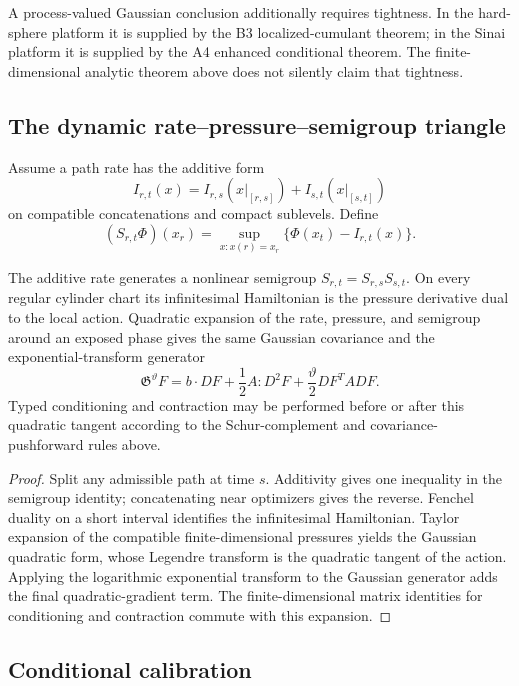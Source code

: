 A process-valued Gaussian conclusion additionally requires tightness.  In the
hard-sphere platform it is supplied by the B3 localized-cumulant theorem; in
the Sinai platform it is supplied by the A4 enhanced conditional theorem.
The finite-dimensional analytic theorem above does not silently claim that
tightness.

\subsection{The dynamic rate--pressure--semigroup triangle}

Assume a path rate has the additive form
\[
I_{r,t}(x)=I_{r,s}(x|_{[r,s]})+I_{s,t}(x|_{[s,t]})
\]
on compatible concatenations and compact sublevels.  Define
\[
(S_{r,t}\Phi)(x_r)=
\sup_{x:x(r)=x_r}\{\Phi(x_t)-I_{r,t}(x)\}.
\]

\begin{theorem}
\label{thm:r6-d1-dynamic}
The additive rate generates a nonlinear semigroup
\(S_{r,t}=S_{r,s}S_{s,t}\).  On every regular cylinder chart its infinitesimal
Hamiltonian is the pressure derivative dual to the local action.  Quadratic
expansion of the rate, pressure, and semigroup around an exposed phase gives
the same Gaussian covariance and the exponential-transform generator
\[
\mathfrak G^\vartheta F=
 b\cdot DF+\frac12A:D^2F+
\frac\vartheta2DF^TADF.
\]
Typed conditioning and contraction may be performed before or after this
quadratic tangent according to the Schur-complement and covariance-pushforward
rules above.
\end{theorem}

\begin{proof}
Split any admissible path at time \(s\).  Additivity gives one inequality in
the semigroup identity; concatenating near optimizers gives the reverse.
Fenchel duality on a short interval identifies the infinitesimal Hamiltonian.
Taylor expansion of the compatible finite-dimensional pressures yields the
Gaussian quadratic form, whose Legendre transform is the quadratic tangent of
the action.  Applying the logarithmic exponential transform to the Gaussian
generator adds the final quadratic-gradient term.  The finite-dimensional
matrix identities for conditioning and contraction commute with this
expansion.
\end{proof}

\subsection{Conditional calibration}

